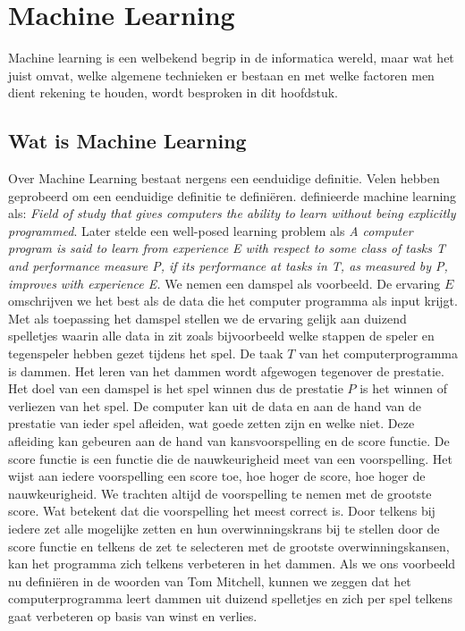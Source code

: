 
\chapter{Machine Learning}\label{Machine Learning}

Machine learning is een welbekend begrip in de informatica wereld, maar wat het juist omvat, welke algemene technieken er bestaan en met welke factoren men dient rekening te houden, wordt besproken in dit hoofdstuk.

\section{Wat is Machine Learning}\label{Wat is Machine Learning}

Over Machine Learning bestaat nergens een eenduidige definitie. Velen hebben geprobeerd om een eenduidige definitie te defini\"eren. \citet{samuel2000some} definieerde machine learning als:
\newline
\newline
\textit{Field of study that gives computers the ability to learn without being explicitly programmed}.
\newline
\newline
Later stelde \citet{mitchell1997machine} een well-posed learning problem als 
\newline
\newline
\textit{A computer program is said to learn from experience E with respect to some class of tasks T and performance measure P, if its performance at tasks in T, as measured by P, improves with experience E.}
\newline
\newline
%
We nemen een damspel als voorbeeld. De ervaring $E$ omschrijven we het best als de data die het computer programma als input krijgt. Met als toepassing het damspel stellen we de ervaring gelijk aan duizend spelletjes waarin alle data in zit zoals bijvoorbeeld welke stappen de speler en tegenspeler hebben gezet tijdens het spel. De taak $T$ van het computerprogramma is dammen. Het leren van het dammen wordt afgewogen tegenover de prestatie. Het doel van een damspel is het spel winnen dus de prestatie $P$ is het winnen of verliezen van het spel. De computer kan uit de data en aan de hand van de prestatie van ieder spel afleiden, wat goede zetten zijn en welke niet. Deze afleiding kan gebeuren aan de hand van kansvoorspelling en de score functie. De score functie is een functie die de nauwkeurigheid meet van een voorspelling. Het wijst aan iedere voorspelling een score toe, hoe hoger de score, hoe hoger de nauwkeurigheid. We trachten altijd  de voorspelling te nemen met de grootste score. Wat betekent dat die voorspelling het meest correct is. Door telkens bij iedere zet alle mogelijke zetten en hun overwinningskrans bij te stellen door de score functie en telkens de zet te selecteren met de grootste overwinningskansen, kan het programma zich telkens verbeteren in het dammen. Als we ons voorbeeld nu defini\"eren in de woorden van Tom Mitchell, kunnen we zeggen dat het computerprogramma leert dammen uit duizend spelletjes en zich per spel telkens gaat verbeteren op basis van winst en verlies.\\    
